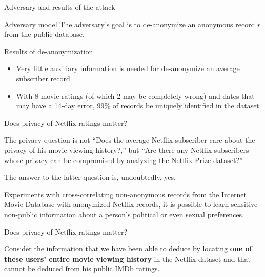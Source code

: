 \documentclass[12pt,aspectratio=169,handout]{beamer}
\begin{document}
\begin{frame}{Adversary and results of the attack}

\begin{block}{Adversary model}
The adversary's goal is to de-anonymize an anonymous record $r$ from the public database.
\end{block}

Results of de-anonymization

\begin{itemize}
\item Very little auxiliary information is needed for de-anonymize an average subscriber record
\item With 8 movie ratings (of which 2 may be completely wrong) and dates that may have a 14-day error, 99\% of records be uniquely identified in the dataset
\end{itemize}


\end{frame}



\begin{frame}{Does privacy of Netflix ratings matter?}

The privacy question is not “Does the average Netflix subscriber care about the privacy of his movie viewing history?,” but “Are there any Netflix subscribers whose privacy can be compromised by analyzing the Netflix Prize dataset?”

The answer to the latter question is, undoubtedly, yes.

Experiments with cross-correlating non-anonymous records from the Internet Movie Database with anonymized Netflix records, it is possible to learn sensitive non-public information about a person’s political or even sexual preferences.



\end{frame}


\begin{frame}{Does privacy of Netflix ratings matter?}

Consider the information that we have been able to deduce by locating \textbf{one of these users’ entire movie viewing history} in the Netflix dataset and that cannot be deduced from his public IMDb ratings. 


\end{frame}
\end{document}
